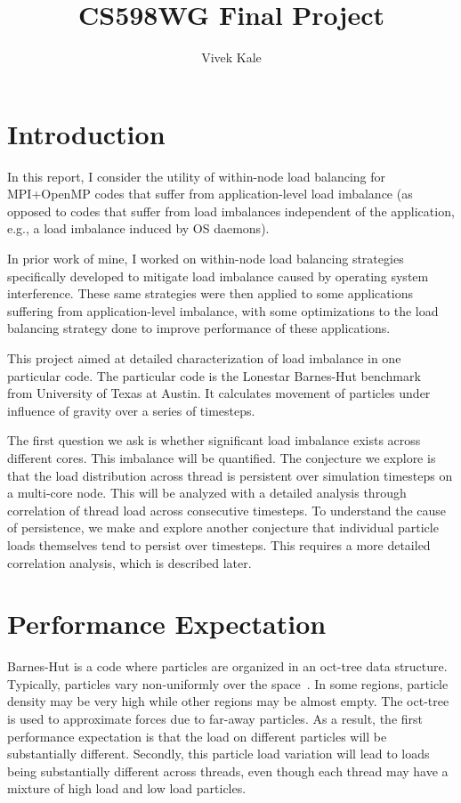 \documentclass[11pt]{article}
\title{}
\author{}
\title{CS598WG Final Project}
\author{Vivek Kale}
\begin{document}
\maketitle


\section{Introduction} 
In this report, I consider the utility of within-node load balancing for
MPI+OpenMP codes that suffer from application-level load imbalance (as
opposed to codes that suffer from load imbalances independent of the
application, e.g., a load imbalance induced by OS daemons). 

In prior work of mine, I worked on within-node load balancing
strategies specifically developed to mitigate load imbalance caused
by operating system interference. These same strategies were then
applied to some applications suffering from application-level
imbalance, with some optimizations to the load balancing strategy done
to improve performance of these applications. 

This project aimed at detailed characterization of load imbalance in
one particular code. The particular code is the Lonestar Barnes-Hut
benchmark~\cite{LonestarBH} from University of Texas at Austin. It
calculates movement of particles under influence of gravity over a
series of timesteps. 

The first question we ask is whether significant load imbalance exists
across different cores. This imbalance will be quantified. The
conjecture we explore is that the load distribution across thread
is persistent over simulation timesteps on a multi-core node. 
This will be analyzed with a detailed analysis through correlation of
thread load across consecutive timesteps. To understand the cause of
persistence, we make and explore another conjecture that
individual particle loads themselves tend to persist over
timesteps. This requires a more detailed correlation analysis, which
is described later. 


\section{Performance Expectation}
Barnes-Hut is a code where particles are organized in an oct-tree data
structure. Typically, particles vary non-uniformly over the
space~\cite{BarnesHutPaper}. In some regions, particle density may be
very high while other regions may be almost empty. The oct-tree is
used to approximate forces due to far-away particles. As a result, the
first performance expectation is that the load on different particles
will be substantially different. Secondly, this particle load
variation will lead to loads being substantially different across
threads, even though each thread may have a mixture of high load and
low load particles. 
\end{document}
